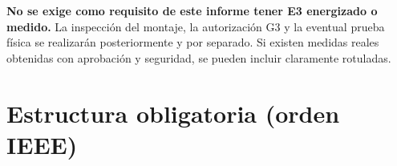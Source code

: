 \documentclass[10pt, a4paper]{article}
\begin{document}
\textbf{No se exige como requisito de este informe tener E3 energizado o medido.} La inspección del montaje, la autorización G3 y la eventual prueba física se realizarán posteriormente y por separado. Si existen medidas reales obtenidas con aprobación y seguridad, se pueden incluir claramente rotuladas.

\section{Estructura obligatoria (orden IEEE)}

\begingroup
\scriptsize
\setlength{\tabcolsep}{4pt}
\renewcommand{\arraystretch}{1.35}
\end{document}
